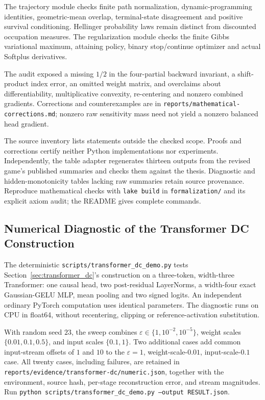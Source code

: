 The trajectory module checks finite path normalization, dynamic-programming identities, geometric-mean overlap, terminal-state disagreement and positive survival conditioning. Hellinger probability laws remain distinct from discounted occupation measures. The regularization module checks the finite Gibbs variational maximum, attaining policy, binary stop/continue optimizer and actual Softplus derivatives.

The audit exposed a missing $1/2$ in the four-partial backward invariant, a shift-product index error, an omitted weight matrix, and overclaims about differentiability, multiplicative convexity, re-centering and nonzero combined gradients. Corrections and counterexamples are in \nolinkurl{reports/mathematical-corrections.md}; nonzero raw sensitivity mass need not yield a nonzero balanced head gradient.

The source inventory lists statements outside the checked scope. Proofs and corrections certify neither Python implementations nor experiments. Independently, the table adapter regenerates thirteen outputs from the revised game's published summaries and checks them against the thesis. Diagnostic and hidden-monotonicity tables lacking raw summaries retain source provenance. Reproduce mathematical checks with \texttt{lake build} in \texttt{formalization/} and its explicit axiom audit; the README gives complete commands.

\subsection{Numerical Diagnostic of the Transformer DC Construction}\label{app:transformer_dc_numeric}

The deterministic \texttt{scripts/transformer\_dc\_demo.py} tests Section~\ref{sec:transformer_dc}'s construction on a three-token, width-three Transformer: one causal head, two post-residual LayerNorms, a width-four exact Gaussian-GELU MLP, mean pooling and two signed logits. An independent ordinary PyTorch computation uses identical parameters. The diagnostic runs on CPU in float64, without recentering, clipping or reference-activation substitution.

With random seed $23$, the sweep combines
$\varepsilon\in\{1,10^{-2},10^{-5}\}$, weight scales
$\{0.01,0.1,0.5\}$, and input scales $\{0.1,1\}$.
Two additional cases add common input-stream offsets of $1$ and $10$ to the
$\varepsilon=1$, weight-scale-$0.01$, input-scale-$0.1$ case.
All twenty cases, including failures, are retained in
\texttt{reports/evidence/transformer-dc/numeric.json}, together with the
environment, source hash, per-stage reconstruction error, and stream magnitudes.
Run \texttt{python}\ \nolinkurl{scripts/transformer_dc_demo.py}\ \texttt{--output RESULT.json}.


